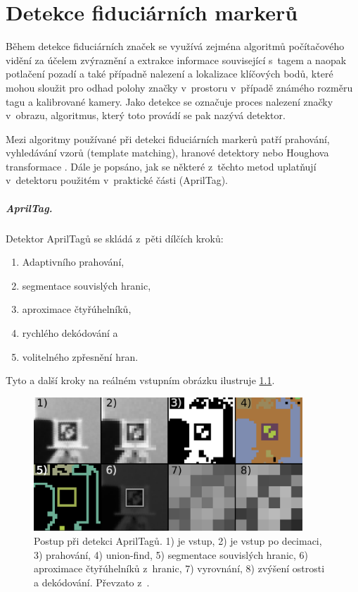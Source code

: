\chapter{Detekce fiduciárních markerů} \label{chap:detection}
  Během detekce fiduciárních značek se využívá zejména algoritmů počítačového vidění za účelem zvýraznění a extrakce informace související s~tagem a naopak potlačení pozadí a také případně nalezení a lokalizace klíčových bodů, které mohou sloužit pro odhad polohy značky v~prostoru v~případě známého rozměru tagu a kalibrované kamery. Jako detekce se označuje proces nalezení značky v~obrazu, algoritmus, který toto provádí se pak nazývá detektor.

  Mezi algoritmy používané při detekci fiduciárních markerů patří prahování, vyhledávání vzorů (template matching), hranové detektory \cite{apriltag2} nebo Houghova transformace \cite{Shabalina2019}. Dále je popsáno, jak se některé z~těchto metod uplatňují v~detektoru použitém v~praktické části (AprilTag).

  \paragraph{AprilTag.} Detektor AprilTagů se skládá z~pěti dílčích kroků: 
  \begin{enumerate}
    \item Adaptivního prahování,
    \item segmentace souvislých hranic,
    \item aproximace čtyřúhelníků,
    \item rychlého dekódování a
    \item volitelného zpřesnění hran.
  \end{enumerate}
  Tyto a další kroky na reálném vstupním obrázku ilustruje \cref{fig:apriltagAlg}.
\begin{figure}
  \centering
  \includegraphics[width=0.9\textwidth]{img/detection/apriltag_alg.png}
  \caption[Postup při detekci AprilTagů]{Postup při detekci AprilTagů. 1) je vstup, 2) je vstup po decimaci, 3) prahování, 4) union-find, 5) segmentace souvislých hranic, 6) aproximace čtyřúhelníků z~hranic, 7) vyrovnání, 8) zvýšení ostrosti a dekódování. Převzato z~\cite{apriltag3}.}
  \label{fig:apriltagAlg}
\end{figure}

